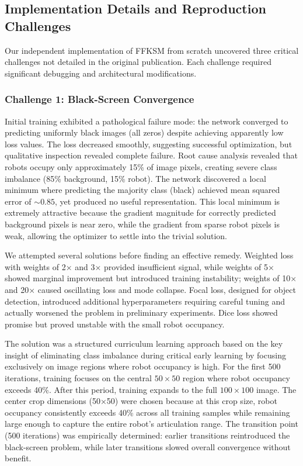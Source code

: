 \documentclass[12pt,a4paper,oneside]{report}
\begin{document}
\subsection{Implementation Details and Reproduction Challenges}
\label{subsec:implementation_details_and_reproduction_challenges}

Our independent implementation of FFKSM from scratch uncovered three critical challenges not detailed in the original publication. Each challenge required significant debugging and architectural modifications.

\subsubsection{Challenge 1: Black-Screen Convergence}
\label{subsubsec:challenge_1_black_screen_convergence}

Initial training exhibited a pathological failure mode: the network converged to predicting uniformly black images (all zeros) despite achieving apparently low loss values. The loss decreased smoothly, suggesting successful optimization, but qualitative inspection revealed complete failure. Root cause analysis revealed that robots occupy only approximately 15\% of image pixels, creating severe class imbalance (85\% background, 15\% robot). The network discovered a local minimum where predicting the majority class (black) achieved mean squared error of $\sim 0.85$, yet produced no useful representation. This local minimum is extremely attractive because the gradient magnitude for correctly predicted background pixels is near zero, while the gradient from sparse robot pixels is weak, allowing the optimizer to settle into the trivial solution.

We attempted several solutions before finding an effective remedy. Weighted loss with weights of 2× and 3× provided insufficient signal, while weights of 5× showed marginal improvement but introduced training instability; weights of 10× and 20× caused oscillating loss and mode collapse. Focal loss, designed for object detection, introduced additional hyperparameters requiring careful tuning and actually worsened the problem in preliminary experiments. Dice loss showed promise but proved unstable with the small robot occupancy.

The solution was a structured curriculum learning approach based on the key insight of eliminating class imbalance during critical early learning by focusing exclusively on image regions where robot occupancy is high. For the first 500 iterations, training focuses on the central $50 \times 50$ region where robot occupancy exceeds 40\%. After this period, training expands to the full $100 \times 100$ image. The center crop dimensions (50×50) were chosen because at this crop size, robot occupancy consistently exceeds 40\% across all training samples while remaining large enough to capture the entire robot's articulation range. The transition point (500 iterations) was empirically determined: earlier transitions reintroduced the black-screen problem, while later transitions slowed overall convergence without benefit.
\end{document}
